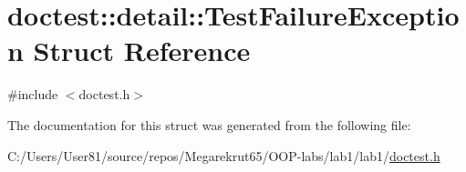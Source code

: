 \hypertarget{structdoctest_1_1detail_1_1_test_failure_exception}{}\section{doctest\+:\+:detail\+:\+:Test\+Failure\+Exception Struct Reference}
\label{structdoctest_1_1detail_1_1_test_failure_exception}


{\ttfamily \#include $<$doctest.\+h$>$}



The documentation for this struct was generated from the following file\+:\begin{DoxyCompactItemize}
\item 
C\+:/\+Users/\+User81/source/repos/\+Megarekrut65/\+O\+O\+P-\/labs/lab1/lab1/\mbox{\hyperlink{doctest_8h}{doctest.\+h}}\end{DoxyCompactItemize}

